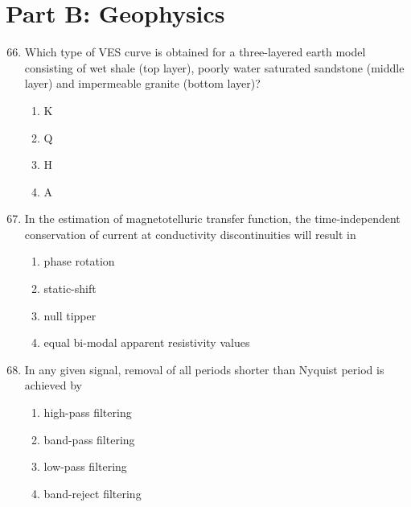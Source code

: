 \documentclass[journal,12pt,onecolumn]{IEEEtran}
\theoremstyle{remark}
\begin{document}
\section*{Part B: Geophysics }
\vspace{0.7cm}
\begin{enumerate}
\setcounter{enumi}{65}

\item Which type of VES curve is obtained for a three-layered earth model consisting of wet shale (top layer), poorly water saturated sandstone (middle layer) and impermeable granite (bottom layer)?

\begin{multicols}{4}
\begin{enumerate}
\item K  
\item Q  
\item H  
\item A  
\end{enumerate}
\end{multicols}

\item In the estimation of magnetotelluric transfer function, the time-independent conservation of current at conductivity discontinuities will result in

\begin{multicols}{2}
\begin{enumerate}
\item phase rotation  
\item static-shift  
\item null tipper  
\item equal bi-modal apparent resistivity values  
\end{enumerate}
\end{multicols}

\item In any given signal, removal of all periods shorter than Nyquist period is achieved by

\begin{multicols}{2}
\begin{enumerate}
\item high-pass filtering  
\item band-pass filtering  
\item low-pass filtering  
\item band-reject filtering  
\end{enumerate}
\end{multicols}


\end{enumerate}
\end{document}
